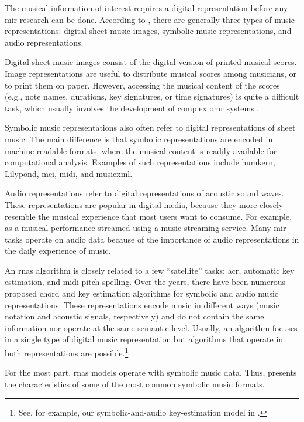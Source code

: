 


The musical information of interest requires a digital
representation before any \gls{mir} research can be done.
According to \textcite{muller2015music}, there are generally
three types of music representations: digital sheet music
images, symbolic music representations, and audio
representations.

Digital sheet music images consist of the digital version of
printed musical scores. Image representations are useful to
distribute musical scores among musicians, or to print them
on paper. However, accessing the musical content of the
scores (e.g., note names, durations, key signatures, or time
signatures) is quite a difficult task, which usually
involves the development of complex \gls{omr} systems
\parencite{calvozaragoza2020understanding}.

Symbolic music representations also often refer to digital
representations of sheet music. The main difference is that
symbolic representations are encoded in machine-readable
formats, where the musical content is readily available for
computational analysis. Examples of such representations
include \gls{humkern}, Lilypond, \gls{mei}, \gls{midi}, and
\gls{musicxml}.

Audio representations refer to digital representations of
acoustic sound waves. These representations are popular in
digital media, because they more closely resemble the
musical experience that most users want to consume. For
example, as a musical performance streamed using a
music-streaming service. Many \gls{mir} tasks operate on
audio data because of the importance of audio
representations in the daily experience of music.

An \glspl{rna} algorithm is closely related to a few
``satellite'' tasks: \gls{acr}, automatic key estimation,
and \gls{midi} pitch spelling. Over the years, there have
been numerous proposed chord and key estimation algorithms
for symbolic and audio music representations. These
representations encode music in different ways (music
notation and acoustic signals, respectively) and do not
contain the same information nor operate at the same
semantic level. Usually, an algorithm focuses in a single
type of digital music representation but algorithms that
operate in both representations are possible.\footnote{See,
for example, our symbolic-and-audio key-estimation model in
\textcite{napoleslopez2019keyfinding}.}

For the most part, \glspl{rna} models operate with symbolic
music data. Thus,  presents
the characteristics of some of the most common symbolic
music formats. 

